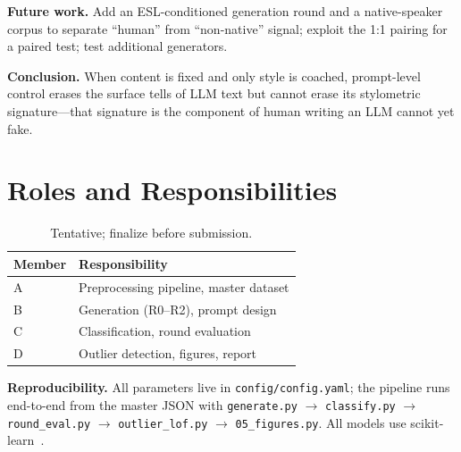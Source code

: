 \documentclass[10pt,twocolumn]{article}
\begin{document}
\textbf{Future work.} Add an ESL-conditioned generation round and a native-speaker corpus to
separate ``human'' from ``non-native'' signal; exploit the 1:1 pairing for a paired test;
test additional generators.

\textbf{Conclusion.} When content is fixed and only style is coached, prompt-level control
erases the surface tells of LLM text but cannot erase its stylometric signature---that
signature is the component of human writing an LLM cannot yet fake.

\section{Roles and Responsibilities}
\begin{table}[H]\centering\small
  \begin{tabular}{ll}
    \toprule
    Member & Responsibility \\
    \midrule
    A & Preprocessing pipeline, master dataset \\
    B & Generation (R0--R2), prompt design \\
    C & Classification, round evaluation \\
    D & Outlier detection, figures, report \\
    \bottomrule
  \end{tabular}
  \caption{Tentative; finalize before submission.}
\end{table}

\textbf{Reproducibility.} All parameters live in \texttt{config/config.yaml}; the pipeline runs
end-to-end from the master JSON with \texttt{generate.py} $\rightarrow$ \texttt{classify.py}
$\rightarrow$ \texttt{round\_eval.py} $\rightarrow$ \texttt{outlier\_lof.py} $\rightarrow$
\texttt{05\_figures.py}. All models use scikit-learn~\cite{pedregosa2011}.



\end{document}
